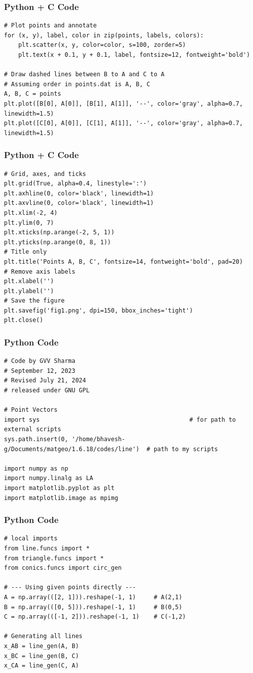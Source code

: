 \documentclass{beamer}
\begin{document}
\begin{frame}[fragile]
    \frametitle{Python + C Code}
    \begin{lstlisting}
# Plot points and annotate
for (x, y), label, color in zip(points, labels, colors):
    plt.scatter(x, y, color=color, s=100, zorder=5)
    plt.text(x + 0.1, y + 0.1, label, fontsize=12, fontweight='bold')

# Draw dashed lines between B to A and C to A
# Assuming order in points.dat is A, B, C
A, B, C = points
plt.plot([B[0], A[0]], [B[1], A[1]], '--', color='gray', alpha=0.7, linewidth=1.5)
plt.plot([C[0], A[0]], [C[1], A[1]], '--', color='gray', alpha=0.7, linewidth=1.5)

    \end{lstlisting}
\end{frame}

\begin{frame}[fragile]
    \frametitle{Python + C Code}
    \begin{lstlisting}
# Grid, axes, and ticks
plt.grid(True, alpha=0.4, linestyle=':')
plt.axhline(0, color='black', linewidth=1)
plt.axvline(0, color='black', linewidth=1)
plt.xlim(-2, 4)
plt.ylim(0, 7)
plt.xticks(np.arange(-2, 5, 1))
plt.yticks(np.arange(0, 8, 1))
# Title only
plt.title('Points A, B, C', fontsize=14, fontweight='bold', pad=20)
# Remove axis labels
plt.xlabel('')
plt.ylabel('')
# Save the figure
plt.savefig('fig1.png', dpi=150, bbox_inches='tight')
plt.close()
    \end{lstlisting}
\end{frame}


\begin{frame}[fragile]
    \frametitle{Python Code}
    \begin{lstlisting}
# Code by GVV Sharma
# September 12, 2023
# Revised July 21, 2024
# released under GNU GPL

# Point Vectors
import sys                                          # for path to external scripts
sys.path.insert(0, '/home/bhavesh-g/Documents/matgeo/1.6.18/codes/line')  # path to my scripts

import numpy as np
import numpy.linalg as LA
import matplotlib.pyplot as plt
import matplotlib.image as mpimg

    \end{lstlisting}
\end{frame}

\begin{frame}[fragile]
    \frametitle{Python Code}
    \begin{lstlisting}
# local imports
from line.funcs import *
from triangle.funcs import *
from conics.funcs import circ_gen

# --- Using given points directly ---
A = np.array(([2, 1])).reshape(-1, 1)     # A(2,1)
B = np.array(([0, 5])).reshape(-1, 1)     # B(0,5)
C = np.array(([-1, 2])).reshape(-1, 1)    # C(-1,2)

# Generating all lines
x_AB = line_gen(A, B)
x_BC = line_gen(B, C)
x_CA = line_gen(C, A)

    \end{lstlisting}
\end{frame}
\end{document}
